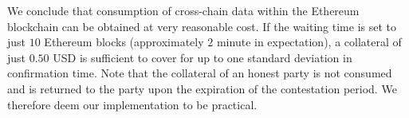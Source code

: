 We conclude that consumption of cross-chain data within the Ethereum blockchain
can be obtained at very reasonable cost. If the waiting time is set to just
$10$ Ethereum blocks (approximately $2$ minute in expectation), a collateral of
just $0.50$ USD is sufficient to cover for up to one standard deviation in
confirmation time. Note that the collateral of an honest party is not consumed
and is returned to the party upon the expiration of the contestation period. We
therefore deem our implementation to be practical.

